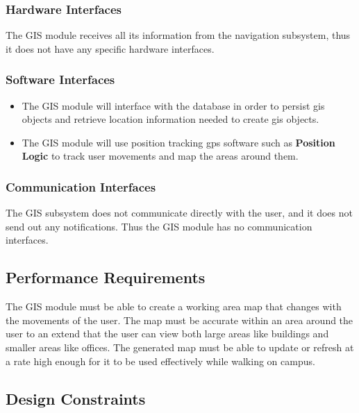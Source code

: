 \subsubsection{Hardware Interfaces}
The GIS module receives all its information from the navigation subsystem, thus it does not have any specific hardware interfaces.
\subsubsection{Software Interfaces}
\begin{itemize}
\item The GIS module will interface with the database in order to persist gis objects and retrieve location information needed to create gis objects.

\item The GIS module will use position tracking gps software such as \textbf{Position Logic} to track user movements and map the areas around them.
\end{itemize}

\subsubsection{Communication Interfaces}
The GIS subsystem does not communicate directly with the user, and it does not send out any notifications. Thus the GIS module has no communication interfaces.

\subsection{Performance Requirements}
The GIS module must be able to create a working area map that changes with the movements of the user. The map must be accurate within an area around the user to an extend that the user can view both large areas like buildings and smaller areas like offices. The generated map must be able to update or refresh at a rate high enough for it to be used effectively while walking on campus.

\subsection{Design Constraints}


